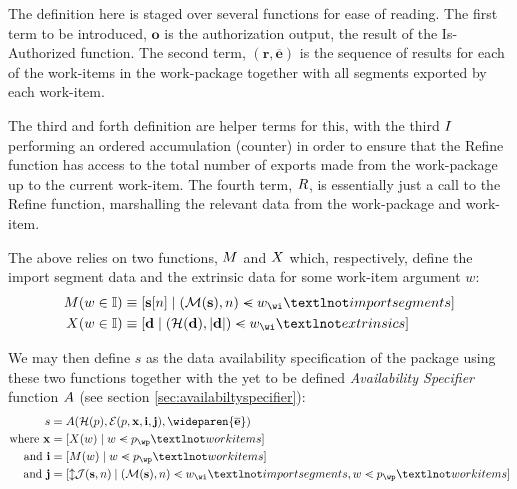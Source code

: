 The definition here is staged over several functions for ease of reading. The first term to be introduced, $\mathbf{o}$ is the authorization output, the result of the Is-Authorized function. The second term, $(\mathbf{r}, \overline{\mathbf{e}})$ is the sequence of results for each of the work-items in the work-package together with all segments exported by each work-item.

The third and forth definition are helper terms for this, with the third $I$ performing an ordered accumulation (\ie counter) in order to ensure that the Refine function has access to the total number of exports made from the work-package up to the current work-item. The fourth term, $R$, is essentially just a call to the Refine function, marshalling the relevant data from the work-package and work-item.


The above relies on two functions, $M$ and $X$ which, respectively, define the import segment data and the extrinsic data for some work-item argument $w$:
\begin{equation}
  \begin{aligned}
    \importsegmentdata(\wiX \in \mathbb{I}) &\equiv [\mathbf{s}[n] \mid (\mathcal{M}(\mathbf{s}), n) \orderedin \wiX_\wi¬importsegments] \\
    \extrinsicdata(\wiX \in \mathbb{I}) &\equiv [\mathbf{d} \mid (\mathcal{H}(\mathbf{d}), |\mathbf{d}|) \orderedin \wiX_\wi¬extrinsics]
  \end{aligned}
\end{equation}

We may then define $s$ as the data availability specification of the package using these two functions together with the yet to be defined \emph{Availability Specifier} function $A$ (see section \ref{sec:availabiltyspecifier}):
\begin{equation}
  \begin{aligned}
    s &= \newavailabilityspecifier(\mathcal{H}(\wpX), \se(\wpX, \mathbf{x}, \mathbf{i}, \mathbf{j}), \wideparen{\overline{\mathbf{e}}}) \\
    \where \mathbf{x} &= [\extrinsicdata(\wiX) \mid \wiX \orderedin \wpX_\wp¬workitems]\\
    \also \mathbf{i} &= [\importsegmentdata(\wiX) \mid \wiX \orderedin \wpX_\wp¬workitems]\\
    \also \mathbf{j} &= [\var{\mathcal{J}(\mathbf{s}, n)} \mid (\mathcal{M}(\mathbf{s}), n) \orderedin \wiX_\wi¬importsegments, \wiX \orderedin \wpX_\wp¬workitems]
  \end{aligned}
\end{equation}

